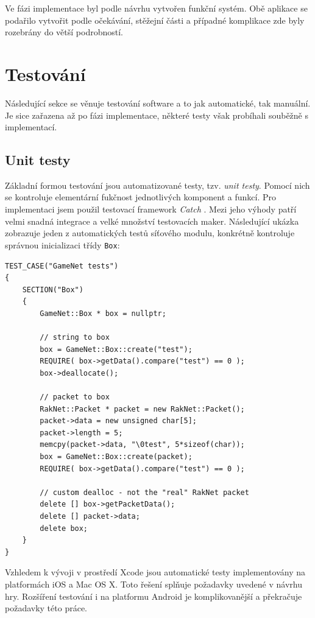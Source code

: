 \documentclass[thesis=B,czech,hidelinks]{FITthesis}[2012/06/26] %
\newcommand{\code}[1]{\texttt{#1}}
\begin{document}
Ve fázi implementace byl podle návrhu vytvořen funkční systém. Obě aplikace se podařilo vytvořit podle očekávání, stěžejní části a případné komplikace zde byly rozebrány do větší podrobností. 


\section{Testování}
\label{section:testing}

Následující sekce se věnuje testování software a to jak automatické, tak manuální. Je sice zařazena až po fázi implementace, některé testy však probíhali souběžně s implementací. 

\subsection{Unit testy}

Základní formou testování jsou automatizované testy, tzv. \textit{unit testy}. Pomocí nich se kontroluje elementární fukčnost jednotlivých komponent a funkcí. Pro implementaci jsem použil testovací framework \textit{Catch} \cite{catch}. Mezi jeho výhody patří velmi snadná integrace a velké množství testovacích maker. Následující ukázka zobrazuje jeden z automatických testů síťového modulu, konkrétně kontroluje správnou inicializaci třídy \code{Box}:

\begin{verbatim}
TEST_CASE("GameNet tests")
{
    SECTION("Box") 
    { 
        GameNet::Box * box = nullptr;
        
        // string to box
        box = GameNet::Box::create("test");
        REQUIRE( box->getData().compare("test") == 0 );
        box->deallocate();
        
        // packet to box
        RakNet::Packet * packet = new RakNet::Packet();
        packet->data = new unsigned char[5];
        packet->length = 5;
        memcpy(packet->data, "\0test", 5*sizeof(char));
        box = GameNet::Box::create(packet);
        REQUIRE( box->getData().compare("test") == 0 );
		
        // custom dealloc - not the "real" RakNet packet
        delete [] box->getPacketData();
        delete [] packet->data;
        delete box;
    }
}
\end{verbatim}

Vzhledem k vývoji v prostředí Xcode jsou automatické testy implementovány na platformách iOS a Mac OS X. Toto řešení splňuje požadavky uvedené v návrhu hry. Rozšíření testování i na platformu Android je komplikovanější a překračuje požadavky této práce.
\end{document}
